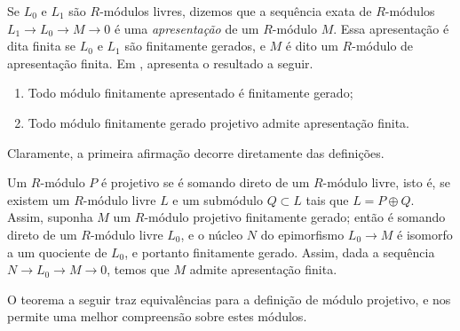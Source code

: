 Se $L_0$ e $L_1$ são $R$-módulos livres, dizemos que a sequência exata de $R$-módulos $L_1 \rightarrow L_0 \rightarrow M \rightarrow 0$ é uma \emph{apresentação} de um $R$-módulo $M$. Essa apresentação é dita finita se $L_0$ e $L_1$ são finitamente gerados, e $M$ é dito um $R$-módulo de apresentação finita. Em \cite[I, , p.20]{bourbaki}, \citeauthor{bourbaki} apresenta o resultado a seguir.
\begin{prop}
\begin{enumerate}
    \item Todo módulo finitamente apresentado é finitamente gerado;
    \item Todo módulo finitamente gerado projetivo admite apresentação finita.
\end{enumerate}
\end{prop} \par
Claramente, a primeira afirmação decorre diretamente das definições. \par 
Um $R$-módulo $P$ é projetivo se é somando direto de um $R$-módulo livre, isto é, se existem um $R$-módulo livre $L$ e um submódulo $Q \subset L$ tais que $L=P\oplus Q$. Assim, suponha $M$ um $R$-módulo projetivo finitamente gerado; então é somando direto de um $R$-módulo livre $L_0$, e o núcleo $N$ do epimorfismo $L_0 \rightarrow M$ é isomorfo a um quociente de $L_0$, e portanto finitamente gerado. Assim, dada a sequência $N \rightarrow L_0 \rightarrow M \rightarrow 0$, temos que $M$ admite apresentação finita. \par 
O teorema a seguir traz equivalências para a definição de módulo projetivo, e nos permite uma melhor compreensão sobre estes módulos.
